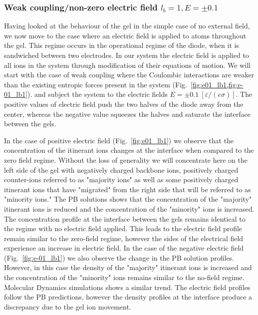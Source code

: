 \documentclass[twoside,twocolumn,9pt]{article}
\begin{document}
\subsubsection{Weak coupling/non-zero electric field $l_b=1, E=\pm0.1$}
Having looked at the behaviour of the gel in the simple case of no external field, we now move to the case where an electric field is applied to atoms throughout the gel. This regime occurs in the operational regime of the diode, when it is sandwiched between two electrodes. In our system the electric field is applied to all ions in the system through modification of their equations of motion. We will start with the case of weak coupling where the Coulombic interactions are weaker than the existing entropic forces present in the system (Fig.~\ref{fig:e01_lb1,fig:e-01_lb1}). and subject the system to the electric fields $E= \pm 0.1~[\varepsilon/(e \sigma)]$. The positive values of electric field push the two halves of the diode away from the center, whereas the negative value squeezes the halves and saturate the interface between the gels.

In the case of positive electric field (Fig.~\ref{fig:e01_lb1}) we observe that the concentration of the itinerant ions changes at the interface when compared to the zero field regime. Without the loss of generality we will concentrate here on the left side of the gel with negatively charged backbone ions, positively charged counter-ions referred to as "majority ions" as well as some positively charged itinerant ions that have "migrated" from the right side that will be referred to as "minority ions." The PB solutions shows that the concentration of the "majority" itinerant ions is reduced and the concentration of the "minority" ions is increased. The concentration profile at the interface between the gels remains identical to the regime with no electric field applied. This leads to the electric field profile  remain similar to the zero-field regime, however the sides of the electrical field experience an increase in electric field. In the case of the negative electric field (Fig.~\ref{fig:e-01_lb1}) we also observe the change in the PB solution profiles. However, in this case the density of the "majority" itinerant ions is increased and the concentration of the "minority" ions remains similar to the no-field regime. Molecular Dynamics simulations shows a similar trend. The electric field profiles follow the PB predictions, however the density profiles at the interface produce a discrepancy due to the gel ion movement.
\end{document}
